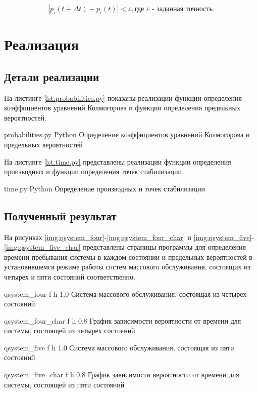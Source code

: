 \begin{equation}
	|p_{i}(t + \Delta t) - p_{i}(t)| < \varepsilon, \text{где } \varepsilon \text{ - заданная точность.}
\end{equation} 

\chapter{Реализация}

\section{Детали реализации}

На листинге \ref{lst:probabilities.py} показаны реализации функции определения коэффициентов уравнений Колмогорова и функции определения предельных вероятностей.

    {probabilities.py}
    {Python}
    {Определение коэффициентов уравнений Колмогорова и предельных вероятностей}
    
На листинге \ref{lst:time.py} представлены реализации функции определения производных и функции определения точек стабилизации.

    {time.py}
    {Python}
    {Определение производных и точек стабилизации}

\section{Полученный результат}

На рисунках \ref{img:qsystem_four}-\ref{img:qsystem_four_char} и \ref{img:qsystem_five}-\ref{img:qsystem_five_char} представлены страницы программы для определения времени пребывания системы в каждом состоянии и предельных вероятностей в установившемся режиме работы систем массового обслуживания, состоящих из четырех и пяти состояний соответственно.

    {qsystem_four}
    {f}
    {h}
    {1.0\textwidth}
    {Система массового обслуживания, состоящая из четырех состояний}
    
    {qsystem_four_char}
    {f}
    {h}
    {0.8\textwidth}
    {График зависимости вероятности от времени для системы, состоящей из четырех состояний}
    
    {qsystem_five}
    {f}
    {h}
    {1.0\textwidth}
    {Система массового обслуживания, состоящая из пяти состояний}
    
    {qsystem_five_char}
    {f}
    {h}
    {0.8\textwidth}
    {График зависимости вероятности от времени для системы, состоящей из пяти состояний}
